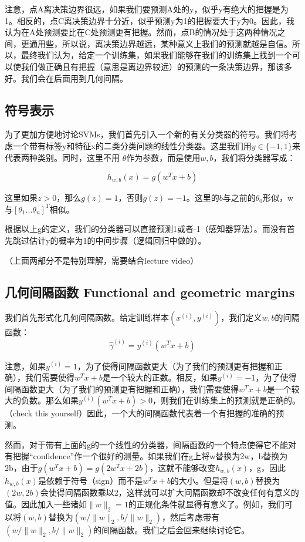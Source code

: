 \documentclass[UTF8]{ctexart}
\begin{document}
注意，点A离决策边界很远，如果我们要预测A处的y，似乎y有绝大的把握是为1。相反的，点C离决策边界十分近，似乎预测y为1的把握要大于y为0。因此，我认为在A处预测要比在C处预测更有把握。然而，点B的情况处于这两种情况之间，更通用些，所以说，离决策边界越远，某种意义上我们的预测就越是自信。所以，最终我们认为，给定一个训练集，如果我们能够在我们的训练集上找到一个可以使我们做正确且有把握（意思是离边界较远）的预测的一条决策边界，那该多好。我们会在后面用到几何间隔。

\subsection{符号表示}
为了更加方便地讨论SVMs，我们首先引入一个新的有关分类器的符号。我们将考虑一个带有标签y和特征x的二类分类问题的线性分类器。这里我们用$y\in \{-1,1\}$来代表两种类别。同时，这里不用 $\theta$作为参数，而是使用$w,b$，我们将分类器写成：

\[h_{w,b}(x) = g(w^{T}x+b)\]

这里如果$z>0$，那么$g(z)=1$，否则$g(z)=-1$。这里的$b$与之前的$\theta_{0}$形似，w与$[\theta_{1}...\theta_{n}]^{T}$相似。

根据以上g的定义，我们的分类器可以直接预测1或者-1（感知器算法）。而没有首先跳过估计y的概率为1的中间步骤（逻辑回归中做的）。

（上面两部分不是特别理解，需要结合lecture video）

\subsection{几何间隔函数 Functional and geometric margins }

我们首先形式化几何间隔函数。给定训练样本$(x^{(i)},y^{(i)})$，我们定义$w,b$的间隔函数：\[\hat{\gamma}^{(i)} = y^{(i)}(w^{T}x+b)\]

注意，如果$y^{(i)} =1$，为了使得间隔函数更大（为了我们的预测更有把握和正确），我们需要使得$w^{T}x+b$是一个较大的正数。相反，如果$y^{(i)} =-1$，为了使得间隔函数更大（为了我们的预测更有把握和正确），我们需要使得$w^{T}x+b$是一个较大的负数。那么如果$y^{(i)}(w^{T}x+b)>0$，则我们在训练集上的预测就是正确的。（check this yourself）因此，一个大的间隔函数代表着一个有把握的准确的预测。

然而，对于带有上面的g的一个线性的分类器，间隔函数的一个特点使得它不能对有把握“confidence”作一个很好的测量。如果我们在g上将w替换为2w，b替换为2b，由于$g(w^{T}x+b)=g(2w^{T}x+2b)$，这就不能够改变$h_{w,b}(x) $，g，因此$h_{w,b}(x) $是依赖于符号（sign）而不是$w^{T}x+b$的大小。但是将$(w,b)$替换为$(2w,2b)$会使得间隔函数乘以2，这样就可以扩大间隔函数却不改变任何有意义的值。因此加入一些诸如$\|w\|_{2}=1$的正规化条件就显得有意义了。例如，我们可以将$(w,b)$替换为$(w/\|w\|_{2},b/\|w\|_{2})$，然后考虑带有$(w/\|w\|_{2},b/\|w\|_{2})$的间隔函数。我们之后会回来继续讨论它。
\end{document}
